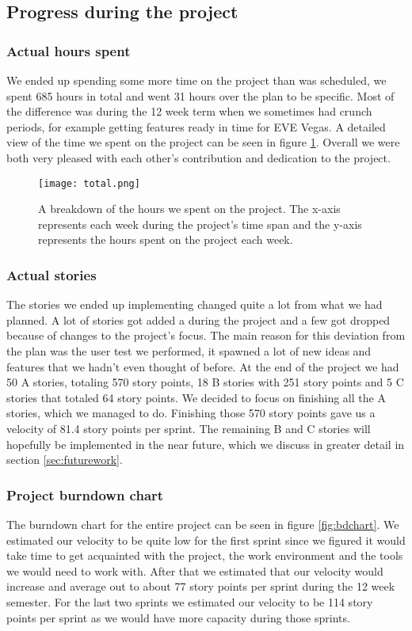 \subsection{Progress during the project}

	\subsubsection{Actual hours spent}
  We ended up spending some more time on the project than was scheduled, we spent 685 hours in total and went 31 hours over the plan to be specific. Most of the difference was during the 12 week term when we sometimes had crunch periods, for example getting features ready in time for EVE Vegas. A detailed view of the time we spent on the project can be seen in figure \ref{fig:total}. Overall we were both very pleased with each other's contribution and dedication to the project. 

		\begin{figure}[H]
      \centering
      \graphicspath{ {./graphics/} }
      \centerline{\texttt{[image: total.png]}}
      \caption{\label{fig:total} A breakdown of the hours we spent on the project. The x-axis represents each week during the project's time span and the y-axis represents the hours spent on the project each week.}
    \end{figure}
	
	\subsubsection{Actual stories}
		The stories we ended up implementing changed quite a lot from what we had planned. A lot of stories got added a during the project and a few got dropped because of changes to the project's focus. The main reason for this deviation from the plan was the user test we performed, it spawned a lot of new ideas and features that we hadn't even thought of before. At the end of the project we had 50 A stories, totaling 570 story points, 18 B stories with 251 story points and 5 C stories that totaled 64 story points. We decided to focus on finishing all the A stories, which we managed to do. Finishing those 570 story points gave us a velocity of 81.4 story points per sprint. The remaining B and C stories will hopefully be implemented in the near future, which we discuss in greater detail in section \ref{sec:futurework}.

	\subsubsection{Project burndown chart}
    The burndown chart for the entire project can be seen in figure \ref{fig:bdchart}. We estimated our velocity to be quite low for the first sprint since we figured it would take time to get acquainted with the project, the work environment and the tools we would need to work with. After that we estimated that our velocity would increase and average out to about 77 story points per sprint during the 12 week semester. For the last two sprints we estimated our velocity to be 114 story points per sprint as we would have more capacity during those sprints. 


